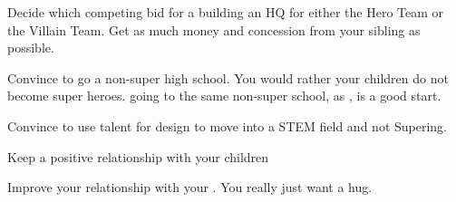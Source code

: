 \documentclass[char]{LRSguildcamp1}
\begin{document}
\begin{itemz}[Goals]
	\item Decide which competing bid for a building an HQ for either the Hero Team or the Villain Team. Get as much money and concession from your sibling as possible.
	
	\item Convince \cTween{} to go a non-super high school. You would rather your children do not become super heroes. \cTween{} going to the same non-super school, \pNormalSchool{} as \cTeen{}, is a good start. 
	
	\item Convince \cTeen{} to use \cTeen{\their} talent for design to move into a STEM field and not Supering.
	
	\item Keep a positive relationship with your children
	
	\item Improve your relationship with your \cGrandma{\parent}. You really just want a hug.
	\end{itemz}

\begin{itemz}[Notes]
	\item 
\end{itemz}
\end{document}
